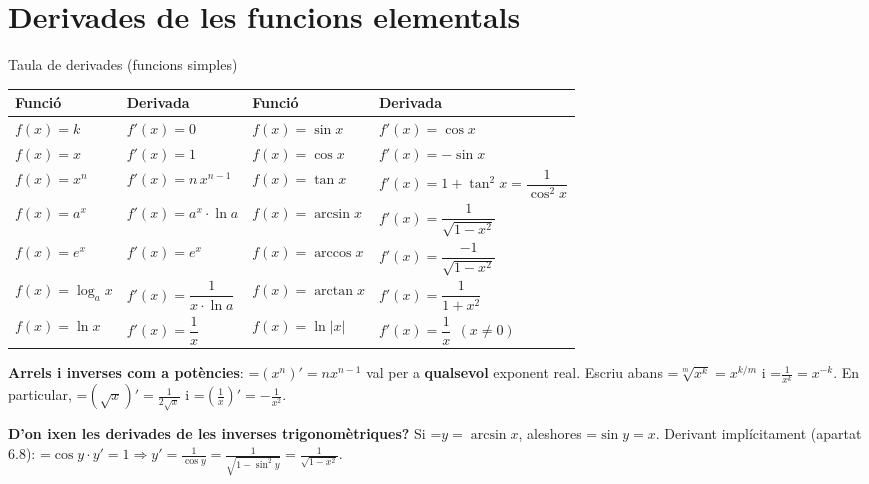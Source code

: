\documentclass[11pt,a4paper]{article}
\newcommand{\fmm}[1]{\setbox0=\hbox{$#1$}\ifdim\wd0>\linewidth\fmdisp{#1}\else\mbox{\box0}\fi}
\newcommand{\fmdisp}[1]{\[\setbox2=\hbox{$\displaystyle #1$}\ifdim\wd2>\linewidth\resizebox{\linewidth}{!}{\box2}\else\box2\fi\]}
\newcommand{\fmuline}[1]{\textbf{\color{fmaccent}#1}}
\begin{document}
\section{Derivades de les funcions elementals}\hypertarget{sec5}{}

\begin{fmdef}{Taula de derivades (funcions simples)}
\begin{center}\renewcommand{\arraystretch}{1.5}\small\begin{tabularx}{\linewidth}{>{\raggedright\arraybackslash}p{3.2cm}>{\raggedright\arraybackslash}X>{\raggedright\arraybackslash}X>{\raggedright\arraybackslash}X}\toprule
\textbf{Funció} & \textbf{Derivada} & \textbf{Funció} & \textbf{Derivada}\\\midrule
$f(x)=k$ & $f'(x)=0$ & $f(x)=\sin x$ & $f'(x)=\cos x$\\[3pt]
$f(x)=x$ & $f'(x)=1$ & $f(x)=\cos x$ & $f'(x)=-\sin x$\\[3pt]
$f(x)=x^n$ & $f'(x)=n\,x^{n-1}$ & $f(x)=\tan x$ & $f'(x)=1+\tan^2x=\dfrac{1}{\cos^2x}$\\[3pt]
$f(x)=a^x$ & $f'(x)=a^x\cdot\ln a$ & $f(x)=\arcsin x$ & $f'(x)=\dfrac{1}{\sqrt{1-x^2}}$\\[3pt]
$f(x)=e^x$ & $f'(x)=e^x$ & $f(x)=\arccos x$ & $f'(x)=\dfrac{-1}{\sqrt{1-x^2}}$\\[3pt]
$f(x)=\log_a x$ & $f'(x)=\dfrac{1}{x\cdot\ln a}$ & $f(x)=\arctan x$ & $f'(x)=\dfrac{1}{1+x^2}$\\[3pt]
$f(x)=\ln x$ & $f'(x)=\dfrac1x$ & $f(x)=\ln|x|$ & $f'(x)=\dfrac1x\ \ (x\neq0)$\\[3pt]
\bottomrule\end{tabularx}\end{center}

\begin{fmnote}\fmuline{Arrels i inverses com a potències}: \fmm{(x^n)'=nx^{n-1}} val per a \textbf{qualsevol} exponent real. Escriu abans \fmm{\sqrt[m]{x^k}=x^{k/m}} i \fmm{\frac{1}{x^k}=x^{-k}}. En particular, \fmm{\left(\sqrt x\right)'=\frac{1}{2\sqrt x}} i \fmm{\left(\frac1x\right)'=-\frac{1}{x^2}}.\end{fmnote}

\begin{fmnote}\fmuline{D'on ixen les derivades de les inverses trigonomètriques?} Si \fmm{y=\arcsin x}, aleshores \fmm{\sin y=x}. Derivant implícitament (apartat 6.8): \fmm{\cos y\cdot y'=1\Rightarrow y'=\frac{1}{\cos y}=\frac{1}{\sqrt{1-\sin^2y}}=\frac{1}{\sqrt{1-x^2}}}.\end{fmnote}
\end{fmdef}
\end{document}

